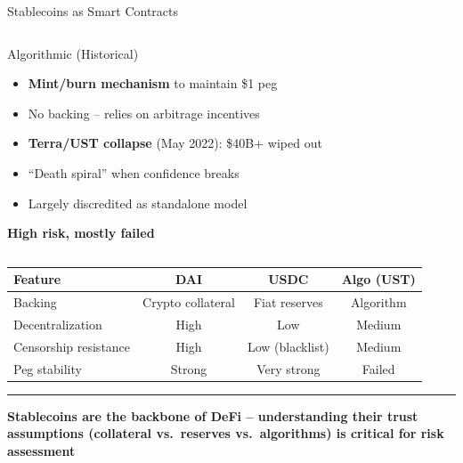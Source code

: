 \documentclass[8pt,aspectratio=169]{beamer}
\newcommand{\bottomnote}[1]{\vfill\vspace{-2mm}\textcolor{mllavender2}{\rule{\textwidth}{0.4pt}}\vspace{1mm}\footnotesize\textbf{#1}}
\begin{document}
\begin{frame}{Stablecoins as Smart Contracts}
\begin{columns}[T]
\begin{block}{\textcolor{mlred}{Algorithmic (Historical)}}
\footnotesize
\begin{itemize}
  \item \textbf{Mint/burn mechanism} to maintain \$1 peg
  \item No backing -- relies on arbitrage incentives
  \item \textbf{Terra/UST collapse} (May 2022): \$40B+ wiped out
  \item ``Death spiral'' when confidence breaks
  \item Largely discredited as standalone model
\end{itemize}
\vspace{1mm}
\centering
\textcolor{mlred}{\textbf{High risk, mostly failed}}
\end{block}
\end{columns}
\vspace{3mm}
\centering
\footnotesize
\begin{tabular}{l c c c}
\toprule
\textbf{Feature} & \textbf{DAI} & \textbf{USDC} & \textbf{Algo (UST)} \\
\midrule
\rowcolor{mllavender4}
Backing & Crypto collateral & Fiat reserves & Algorithm \\
Decentralization & High & Low & Medium \\
\rowcolor{mllavender4}
Censorship resistance & High & Low (blacklist) & Medium \\
Peg stability & Strong & Very strong & Failed \\
\bottomrule
\end{tabular}
\bottomnote{Stablecoins are the backbone of DeFi -- understanding their trust assumptions (collateral vs.\ reserves vs.\ algorithms) is critical for risk assessment}
\end{frame}
\end{document}
